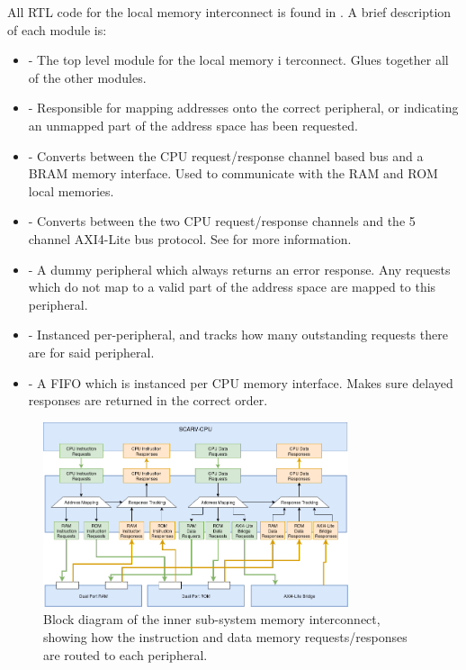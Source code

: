 All RTL code for the local memory interconnect is found in
.
A brief description of each module is:
\begin{itemize}

\item {} - 
    The top level module for the local memory 
    i terconnect. Glues together all of the other modules.

\item {} -
    Responsible for mapping addresses onto the correct peripheral,
    or indicating an unmapped part of the address space has been requested.

\item {} -
    Converts between the CPU request/response channel based bus and a
    BRAM memory interface.
    Used to communicate with the RAM and ROM local memories.

\item {} -
    Converts between the two CPU request/response channels and the 5 channel
    AXI4-Lite bus protocol.
    See  for more information.

\item {} - 
    A dummy peripheral which always returns an error response.
    Any requests which do not map to a valid part of the address space are
    mapped to this peripheral.

\item {} - 
    Instanced per-peripheral, and tracks how many outstanding requests
    there are for said peripheral.

\item {} - 
    A FIFO which is instanced per CPU memory interface.
    Makes sure delayed responses are returned in the correct order.

\end{itemize}

\begin{figure}
\centering
\includegraphics[width=0.8\textwidth]{image/soc-local-ic.png}
\caption{
Block diagram of the \SCARVSOC inner sub-system memory interconnect, 
showing how the \SCARVCPU instruction and data memory requests/responses
are routed to each peripheral.
}
\label{fig:design:soc-local-ic}
\end{figure}

